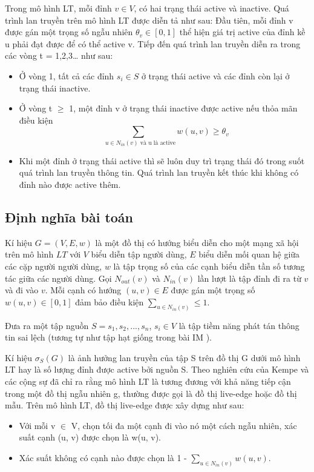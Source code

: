 Trong mô hình LT, mỗi đỉnh $v \in V$, có hai trạng thái active và inactive. Quá trình lan truyền trên mô hình LT được diễn tả như sau: Đầu tiên, mỗi đỉnh v được gán một trọng số ngẫu nhiên $\theta_{v} \in [0,1]$ thể hiện giá trị active của đỉnh kề u phải đạt được để có thể active v. Tiếp đến quá trình lan truyền diễn ra trong các vòng t = 1,2,3… như sau: 		
\begin {itemize}
\item Ở vòng 1, tất cả các đỉnh $s_{i} \in S$ ở trạng thái active và các đỉnh còn lại ở trạng thái inactive.

\item Ở vòng t $\ge$ 1, một đỉnh v ở trạng thái inactive được active nếu thỏa mãn điều kiện $$\sum_{\mbox{ $u \in N_{in}(v) $ và  u  là active}} w(u, v)\geq \theta_v$$

\item Khi một đỉnh ở trạng thái active thì sẽ luôn duy trì trạng thái đó trong suốt quá trình lan truyền thông tin. Quá trình lan truyền kết thúc khi không có đỉnh nào được active thêm.	
\end {itemize}

\subsection{Định nghĩa bài toán}
Kí hiệu $G = (V, E, w)$ là một đồ thị có hướng biểu diễn cho một mạng xã hội trên mô hình $LT$ với $V$ biểu diễn tập người dùng, $E$ biểu diễn mối quan hệ giữa các cặp người người dùng, $w$ là tập trọng số của các cạnh biểu diễn tần số tương tác giữa các người dùng. Gọi $N_{out}(v)$ và $N_{in}(v)$ lần lượt là tập đỉnh đi ra từ $v$ và đi vào $v$. Mỗi cạnh có hướng $(u,v) \in E$ được gán một trọng số $w(u,v) \in [0,1]$ đảm bảo điều kiện $\sum_{u \in N_{in}(v)} \leq 1$.

Đưa ra một tập nguồn $S = {s_{1}, s_{2}, ... , s_{n}}$, $s_{i} \in V$ là tập tiềm năng phát tán thông tin sai lệch (tương tự như tập hạt giống trong bài IM \cite{kemple2}).

Kí hiệu $\sigma_{S}(G)$ là ảnh hưởng lan truyền của tập S trên đồ thị G dưới mô hình LT hay là số lượng đỉnh được active bởi nguồn S. Theo nghiên cứu của Kempe và các cộng sự \cite{kemple1} đã chỉ ra rằng mô hình LT là tương đương với khả năng tiếp cận trong một đồ thị ngẫu nhiên g, thường được gọi là đồ thị live-edge hoặc đồ thị mẫu. Trên mô hình LT, đồ thị live-edge được xây dựng như sau:
\begin {itemize}
\item Với mỗi v $\in$ V, chọn tối đa một cạnh đi vào nó một cách ngẫu nhiên, xác suất cạnh (u, v) được chọn là w(u, v).

\item Xác suất không có cạnh nào được chọn là 1 - $\sum_{u \in N_{in}(v)} w(u,v)$.
\end {itemize}

